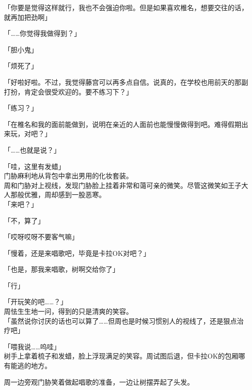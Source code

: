 「你要是觉得这样就行，我也不会强迫你啦。但是如果喜欢椎名，想要交往的话，就再加把劲啊」

「……你觉得我做得到？」

「胆小鬼」

「烦死了」

「好啦好啦。不过，我觉得藤宫可以再多点自信。说真的，在学校也用前天的那副打扮，肯定会很受欢迎的。要不练习下？」

「练习？」

「在椎名和我的面前能做到，说明在亲近的人面前也能慢慢做得到吧。难得假期出来玩，对吧？」

「……也就是说？」

「哇，这里有发蜡」\\

门胁麻利地从背包中拿出男用的化妆套装。\\

周和门胁对上视线，发现门胁脸上挂着非常和蔼可亲的微笑。尽管这微笑如王子大人那般优雅，周却感到一股恶寒。\\

「来吧？」

「不，算了」

「哎呀哎呀不要客气嘛」

「慢着，还是来唱歌吧，毕竟是卡拉OK对吧？」

「也是，那我来唱歌，树啊交给你了」

「行」

「开玩笑的吧……？」\\

周怯生生地一问，得到的只是清爽的笑容。\\

「虽然说你讨厌的话也可以算了……但周也是时候习惯别人的视线了，还是狠点治疗吧」

「喂我说……呜哇」\\

树手上拿着梳子和发蜡，脸上浮现满足的笑容。周试图后退，但卡拉OK的包厢哪有能逃的地方。

周一边旁观门胁笑着做起唱歌的准备，一边让树摆弄起了头发。
